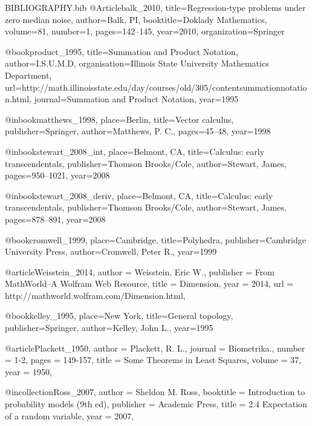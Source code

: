 \RequirePackage{filecontents}
\begin{filecontents}{BIBLIOGRAPHY.bib}
@Article{balk_2010,
  title={Regression-type problems under zero median noise},
  author={Balk, PI},
  booktitle={Doklady Mathematics},
  volume={81},
  number={1},
  pages={142--145},
  year={2010},
  organization={Springer}
}

@book{product_1995, 
 title={Summation and Product Notation},
 author={I.S.U.M.D},
 organisation={Illinois State University Mathematics Department},
 url={http://math.illinoisstate.edu/day/courses/old/305/contentsummationnotation.html},  
 journal={Summation and Product Notation}, 
 year={1995}}
 
 @inbook{matthews_1998, 
 place={Berlin}, 
 title={Vector calculus}, 
 publisher={Springer}, 
 author={Matthews, P. C.}, 
 pages={45--48},
 year={1998}}


@inbook{stewart_2008_int, 
 place={Belmont, CA}, 
 title={Calculus: early transcendentals}, 
 publisher={Thomson Brooks/Cole}, 
 author={Stewart, James}, 
 pages={950--1021},
 year={2008}}
 
 @inbook{stewart_2008_deriv, 
 place={Belmont, CA}, 
 title={Calculus: early transcendentals}, 
 publisher={Thomson Brooks/Cole}, 
 author={Stewart, James}, 
 pages={878--891},
 year={2008}}
 
@book{cromwell_1999, 
 place={Cambridge}, 
 title={Polyhedra}, 
 publisher={Cambridge University Press}, 
 author={Cromwell, Peter R.}, 
 year={1999}}
 
 @article{Weisstein_2014,
author = {Weisstein, Eric W.},
publisher = {From MathWorld--A Wolfram Web Resource},
title = {Dimension},
year = {2014},
url = {http://mathworld.wolfram.com/Dimension.html},
}

@book{kelley_1995, 
 place={New York}, 
 title={General topology}, 
 publisher={Springer}, 
 author={Kelley, John L.}, 
 year={1995}}
 
 @article{Plackett_1950,
author = {Plackett, R. L.},
journal = {Biometrika.},
number = {1-2},
pages = {149-157},
title = {Some Theorems in Least Squares},
volume = {37},
year = {1950},
}

@incollection{Ross_2007,
author = {Sheldon M. Ross},
booktitle = {Introduction to probability models (9th ed)},
publisher = {Academic Press},
title = {2.4 Expectation of a random variable},
year = {2007},
}

\end{filecontents}
\documentclass[11pt,a4paper]{article}
\usepackage{graphicx}
\graphicspath{ {images/} }
\usepackage{natbib}
\usepackage[rightcaption]{sidecap}
\usepackage{svg}
\usepackage{transparent}
\usepackage{xcolor}
\usepackage{relsize}
\usepackage{amsmath}
\usepackage{amsfonts}
\usepackage[margin=2cm]{geometry}
\usepackage{fancyhdr}
\usepackage{enumitem}
\pagestyle{fancy}
\usepackage{float}
\usepackage{cancel}
\usepackage{subfig}
\usepackage{multirow}
\usepackage[utf8]{inputenc}

